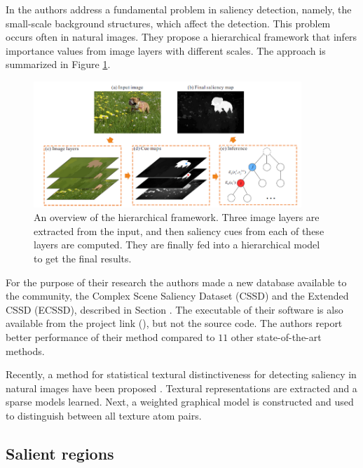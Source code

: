 In \cite{YanCVPR2013} the authors address a fundamental problem in saliency detection, namely, the small-scale background structures, which affect the detection. This problem occurs often in natural images. They propose a hierarchical framework that infers importance values from image layers with different scales. The approach is summarized in Figure \ref{fig:hier_yan13}.

\begin{figure}[H]
\begin{center}
\includegraphics[width=0.9\textwidth]{fig/Hierarchy_Yan13}
\end{center}
\caption{An overview of the hierarchical framework. Three image layers are extracted from the input, and then  saliency cues from each of these layers are computed. They are finally fed into a hierarchical model to get the final results.}
\label{fig:hier_yan13}
\end{figure}

For the purpose of their research the authors made a new database available to the community, the Complex Scene Saliency Dataset (CSSD) and the Extended CSSD (ECSSD), described in Section . The executable of their software is also available from the project link (\cite{ecssd_db}), but not the source code. The authors report better performance of their method compared to $11$ other state-of-the-art methods.

Recently, a method for statistical textural distinctiveness for detecting saliency in natural images have been proposed \cite{texstatdist2013}. Textural representations are extracted and a sparse models learned. Next, a weighted graphical model is constructed and used to distinguish between all texture atom pairs.

\subsection{Salient regions}


